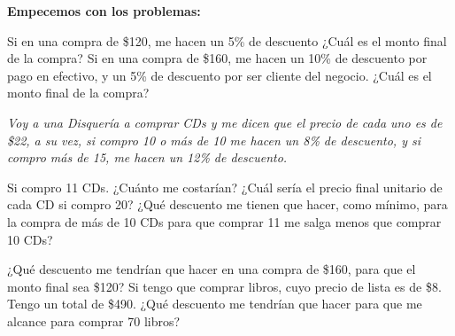 \documentclass[12pt]{exam}
\begin{document}
\begin{questions}
\begin{parts}
    \end{parts}
    
    \textbf{Empecemos con los problemas:}

     
        \question Si en una compra de \$120, me hacen un 5\% de descuento ¿Cuál es el monto final de la compra?
        \question Si en una compra de \$160, me hacen un 10\% de descuento por pago en efectivo, y un 5\% de descuento por ser cliente del negocio. ¿Cuál es el monto final de la compra?
        
        \textit{Voy a una Disquería a comprar CDs y me dicen que el precio de cada uno es de \$22, a su vez, si compro 10 o más de 10 me hacen un 8\% de descuento, y si compro más de 15, me hacen un 12\% de descuento.}
        
        \question Si compro 11 CDs. ¿Cuánto me costarían?
        \question ¿Cuál sería el precio final unitario de cada CD si compro 20?
        \question ¿Qué descuento me tienen que hacer, como mínimo, para la compra de más de 10 CDs para que comprar 11 me salga menos que comprar 10 CDs?
        
        \question ¿Qué descuento me tendrían que hacer en una compra de \$160, para que el monto final sea \$120?
        \question Si tengo que comprar libros, cuyo precio de lista es de \$8. Tengo un total de \$490. ¿Qué descuento me tendrían que hacer para que me alcance para comprar 70 libros?
        

\end{questions}
\end{document}
